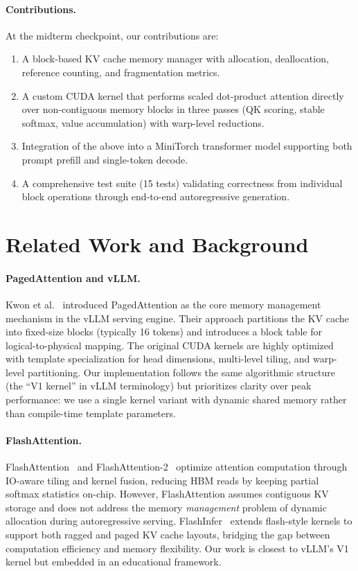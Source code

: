 \documentclass{article}
\begin{document}
\paragraph{Contributions.}
At the midterm checkpoint, our contributions are:
\begin{enumerate}
    \item A block-based KV cache memory manager with allocation, deallocation, reference counting, and fragmentation metrics.
    \item A custom CUDA kernel that performs scaled dot-product attention directly over non-contiguous memory blocks in three passes (QK scoring, stable softmax, value accumulation) with warp-level reductions.
    \item Integration of the above into a MiniTorch transformer model supporting both prompt prefill and single-token decode.
    \item A comprehensive test suite (15 tests) validating correctness from individual block operations through end-to-end autoregressive generation.
\end{enumerate}

\section{Related Work and Background}
\label{sec:related}

\paragraph{PagedAttention and vLLM.}
Kwon et al.~\cite{kwon2023efficient} introduced PagedAttention as the core memory management mechanism in the vLLM serving engine.
Their approach partitions the KV cache into fixed-size blocks (typically 16 tokens) and introduces a block table for logical-to-physical mapping.
The original CUDA kernels are highly optimized with template specialization for head dimensions, multi-level tiling, and warp-level partitioning.
Our implementation follows the same algorithmic structure (the ``V1 kernel'' in vLLM terminology) but prioritizes clarity over peak performance: we use a single kernel variant with dynamic shared memory rather than compile-time template parameters.

\paragraph{FlashAttention.}
FlashAttention~\cite{dao2022flashattention} and FlashAttention-2~\cite{dao2023flashattention2} optimize attention computation through IO-aware tiling and kernel fusion, reducing HBM reads by keeping partial softmax statistics on-chip.
However, FlashAttention assumes contiguous KV storage and does not address the memory \emph{management} problem of dynamic allocation during autoregressive serving.
FlashInfer~\cite{ye2025flashinfer} extends flash-style kernels to support both ragged and paged KV cache layouts, bridging the gap between computation efficiency and memory flexibility.
Our work is closest to vLLM's V1 kernel but embedded in an educational framework.
\end{document}
